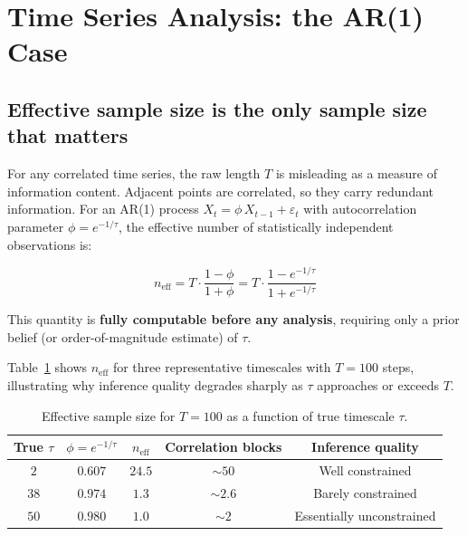 \documentclass[11pt, a4paper]{article}
\begin{document}
\section{Time Series Analysis: the AR(1) Case}

\subsection{Effective sample size is the only sample size that matters}

For any correlated time series, the raw length $T$ is misleading as a measure of
information content. Adjacent points are correlated, so they carry redundant information.
For an AR(1) process $X_t = \phi\, X_{t-1} + \varepsilon_t$ with autocorrelation
parameter $\phi = e^{-1/\tau}$, the effective number of statistically independent
observations is:

\begin{equation}
    \boxed{
        n_\mathrm{eff} = T \cdot \frac{1 - \phi}{1 + \phi}
                       = T \cdot \frac{1 - e^{-1/\tau}}{1 + e^{-1/\tau}}
    }
    \label{eq:neff}
\end{equation}

This quantity is \textbf{fully computable before any analysis}, requiring only a prior
belief (or order-of-magnitude estimate) of $\tau$.

\medskip
Table~\ref{tab:neff_examples} shows $n_\mathrm{eff}$ for three representative
timescales with $T = 100$ steps, illustrating why inference quality degrades sharply
as $\tau$ approaches or exceeds $T$.

\begin{table}[h!]
\centering
\caption{Effective sample size for $T=100$ as a function of true timescale $\tau$.}
\label{tab:neff_examples}
\begin{tabular}{ccccc}
\toprule
True $\tau$ & $\phi = e^{-1/\tau}$ & $n_\mathrm{eff}$ & Correlation blocks & Inference quality \\
\midrule
$2$  & $0.607$ & $24.5$ & $\sim 50$ & Well constrained \\
$38$ & $0.974$ & $1.3$  & $\sim 2.6$ & Barely constrained \\
$50$ & $0.980$ & $1.0$  & $\sim 2$   & Essentially unconstrained \\
\bottomrule
\end{tabular}
\end{table}
\end{document}

